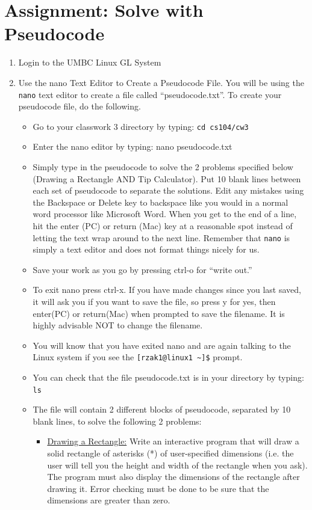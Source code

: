 \documentclass[letter,11pt]{article}
\begin{document}
\section*{Assignment: Solve with Pseudocode}
\begin{enumerate}
    \item Login to the UMBC Linux GL System
    \item Use the nano Text Editor to Create a Pseudocode File. You will be using the \texttt{nano} text editor to create a file called ``pseudocode.txt''.  To create your pseudocode file, do the following.
    \begin{itemize}
        \item Go to your classwork 3 directory by typing: \texttt{cd cs104/cw3}
        \item Enter the nano editor by typing:  nano pseudocode.txt
        \item Simply type in the pseudocode to solve the 2 problems specified below (Drawing a Rectangle AND Tip Calculator). Put 10 blank lines between each set of pseudocode to separate the solutions. Edit any mistakes using the Backspace or Delete key to backspace like you would in a normal word processor like Microsoft Word. When you get to the end of a line, hit the enter (PC) or return (Mac) key at a reasonable spot instead of letting the text wrap around to the next line. Remember that \texttt{nano} is simply a text editor and does not format things nicely for us.
        \item Save your work as you go by pressing ctrl-o for ``write out.''
        \item To exit nano press ctrl-x. If you have made changes since you last saved, it will ask you if you want to save the file, so press y for yes, then enter(PC) or return(Mac) when prompted to save the filename. It is highly advisable NOT to change the filename.
        \item You will know that you have exited nano and are again talking to the Linux system if you see the \verb|[rzak1@linux1 ~]$| prompt.
        \item You can check that the file pseudocode.txt is in your directory by typing:  \texttt{ls}
        \item The file will contain 2 different blocks of pseudocode, separated by 10 blank lines, to solve the following 2 problems:
        \begin{itemize}
            \item \underline{Drawing a Rectangle:} Write an interactive program that will draw a solid rectangle of asterisks (*) of user-specified dimensions (i.e. the user will tell you the height and width of the rectangle when you ask). The program must also display the dimensions of the rectangle after drawing it. Error checking must be done to be sure that the dimensions are greater than zero.

\end{itemize}
\end{itemize}
\end{enumerate}
\end{document}
